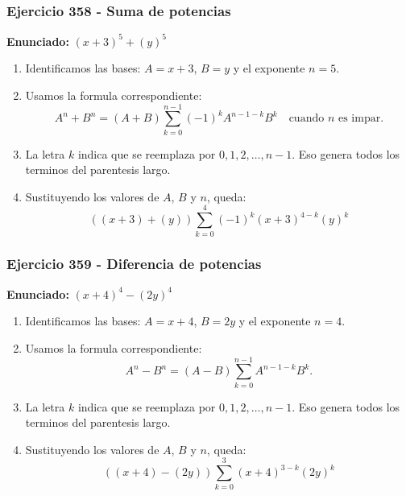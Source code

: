 \documentclass[11pt,a4paper]{article}
\begin{document}
\subsubsection*{Ejercicio 358 - Suma de potencias}
\textbf{Enunciado:} $ \left(x + 3\right)^{5}+\left(y\right)^{5} $\par
\begin{enumerate}[leftmargin=2em]
\item Identificamos las bases: \(A=x + 3\), \(B=y\) y el exponente \(n=5\).
\item Usamos la formula correspondiente: \[A^n+B^n=(A+B)\sum_{k=0}^{n-1}(-1)^kA^{n-1-k}B^k\quad\text{cuando }n\text{ es impar}.\]
\item La letra \(k\) indica que se reemplaza por \(0,1,2,\ldots,n-1\). Eso genera todos los terminos del parentesis largo.
\item Sustituyendo los valores de \(A\), \(B\) y \(n\), queda: \[\boxed{\left(\left(x + 3\right)+\left(y\right)\right)\sum_{k=0}^{4}(-1)^k\left(x + 3\right)^{4-k}\left(y\right)^k}\]
\end{enumerate}

\vspace{0.2cm}
\subsubsection*{Ejercicio 359 - Diferencia de potencias}
\textbf{Enunciado:} $ \left(x + 4\right)^{4}-\left(2 y\right)^{4} $\par
\begin{enumerate}[leftmargin=2em]
\item Identificamos las bases: \(A=x + 4\), \(B=2 y\) y el exponente \(n=4\).
\item Usamos la formula correspondiente: \[A^n-B^n=(A-B)\sum_{k=0}^{n-1}A^{n-1-k}B^k.\]
\item La letra \(k\) indica que se reemplaza por \(0,1,2,\ldots,n-1\). Eso genera todos los terminos del parentesis largo.
\item Sustituyendo los valores de \(A\), \(B\) y \(n\), queda: \[\boxed{\left(\left(x + 4\right)-\left(2 y\right)\right)\sum_{k=0}^{3}\left(x + 4\right)^{3-k}\left(2 y\right)^k}\]
\end{enumerate}

\vspace{0.2cm}
\end{document}
